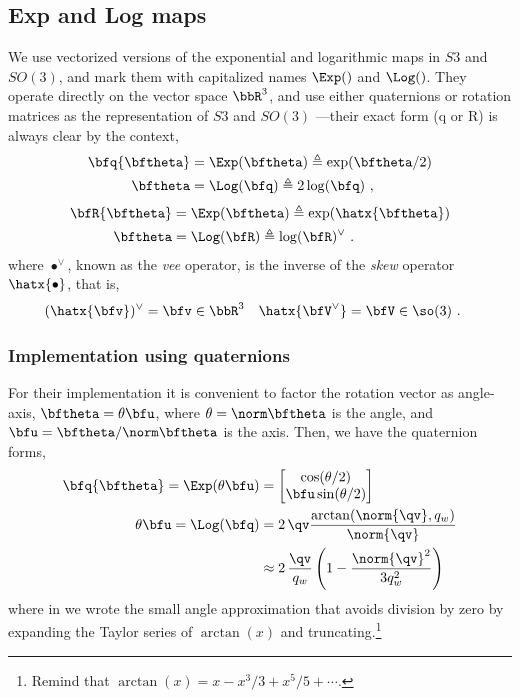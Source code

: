 \subsection{Exp and Log maps}

We use vectorized versions of the exponential and logarithmic maps in $S3$ and $SO(3)$, and mark them with capitalized names $\Exp()$ and $\Log()$. They operate directly on the vector space $\bbR^3$, and use either quaternions or rotation matrices as the representation of $S3$ and $SO(3)$ ---their exact form (q or R) is always clear by the context, 
%
\begin{subequations}
\begin{align}
\bfq\{\bth\} &= \Exp(\bth) \te \exp(\bth/2)\\ 
\bth &= \Log(\bfq) \te 2\log(\bfq)
~,
\end{align}
\end{subequations}
%
\begin{subequations}
\begin{align}
\bfR\{\bth\} &= \Exp(\bth) \te \exp(\hatx{\bth}) \\ 
\bth &= \Log(\bfR) \te \log(\bfR)^\vee 
~.
\end{align}
\end{subequations}
%
where $\bullet^\vee$, known as the \emph{vee} operator, is the inverse of the \emph{skew} operator $\hatx{\bullet}$, that is, 
%
\begin{align*}
(\hatx{\bfv})^\vee &= \bfv \in \bbR^3 & \hatx{\bfV^\vee} &= \bfV \in \so(3)
~.
\end{align*}

\subsubsection{Implementation using quaternions}

For their implementation it is convenient to factor the rotation vector as angle-axis, $\bth=\theta\bfu$, where $\theta=\nth$ is the angle, and $\bfu=\bth/\nth$ is the axis. Then, we have the quaternion forms,
%
\begin{subequations}
\begin{align}
\bfq\{\bth\} = \Exp(\theta\bfu) &= \begin{bmatrix}
\cos(\theta/2) \\ \bfu\sin(\theta/2)
\end{bmatrix} \\
\theta\bfu = \Log(\bfq) &= 2\,\qv\frac{\arctan({\norm{\qv},q_w})}{\norm{\qv}} \\
&\approx 2\,\frac{\qv}{q_w} \left(1 - \frac{\norm{\qv}^2}{3q_w^2}\right) \label{equ:log_q_small}
\end{align}
\end{subequations}
%
where in  we wrote the small angle approximation that avoids division by zero by expanding the Taylor series of $\arctan(x)$ and truncating.\footnote{Remind that $\arctan(x) = x - x^3/3 + x^5/5 + \cdots$.}
%
